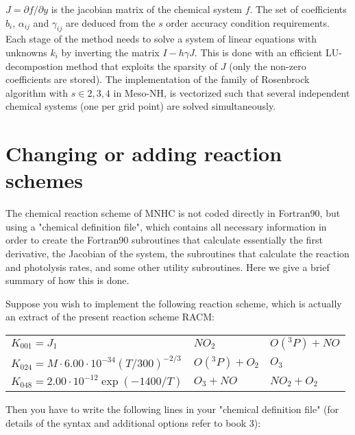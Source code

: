 $J=\partial f/\partial y$ is the jacobian matrix of the chemical system $f$.
The set of coefficients $b_{i}$, $\alpha_{ij}$ and $\gamma_{ij}$ are
deduced from the $s$ order accuracy condition requirements.
Each stage of the method needs to solve a system of linear equations
with unknowns $k_{i}$ by inverting the matrix $I-h \gamma J$. This is
done with an efficient LU-decompostion method that exploits the sparsity
of $J$ (only the non-zero coefficients are stored). The implementation
of the family of Rosenbrock algorithm with $s \in {2, 3, 4}$ in Meso-NH,
is vectorized such that several independent chemical systems (one per
grid point) are solved simultaneously.

%
\section{Changing or adding reaction schemes}
%
The chemical reaction scheme of MNHC is not coded directly in Fortran90,
but using a "chemical definition file", which contains all necessary
information in order to create the Fortran90 subroutines that calculate
essentially the first derivative, the Jacobian of the system,
the subroutines that calculate the reaction and photolysis rates,
and some other utility subroutines.
Here we give a brief summary of how this is done.

Suppose you wish to implement the following reaction scheme, which is
actually an extract of the present reaction scheme RACM:

{\small
\begin{tabular}{l@{\,\,:\,\,}l@{\protect$\quad\longrightarrow\quad\protect$}l}
$K_{001} = J_1$ & $NO_{2}$ & $O({}^3P)+NO$ \\
$K_{024} = M \cdot 6.00\cdot10^{-34} \left( T / 300 \right)^{-2/3} $ 
         & $O({}^3P)+O_{2}$ & $O_{3}$ \\
$K_{048} = 2.00\cdot10^{-12} \exp\left( -1400/T \right)$ 
         & $O_{3}+NO$ & $NO_{2}+O_{2}$ 
\end{tabular}
}

Then you have to write the following lines in your
"chemical definition file" (for details of the syntax and additional 
options refer to book 3):

